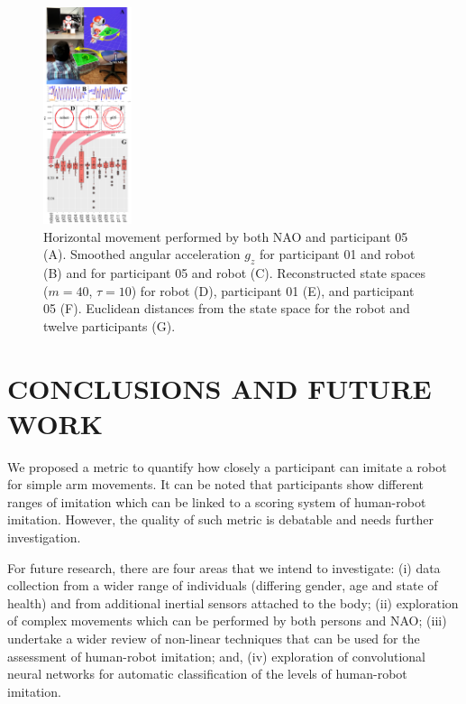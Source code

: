 \documentclass{sig-alternate-05-2015}
\begin{document}
\begin{figure}[ht]
\centering
\includegraphics[width=0.23\textwidth]{fig06}
\caption{
Horizontal movement performed by both NAO and participant 05 (A). 
Smoothed angular acceleration $g_z$ for participant 01  and robot (B)
and for participant 05 and robot (C).
Reconstructed state spaces  ($m=40$, $\tau=10$) for robot (D), participant 01 (E), and participant 05 (F).
Euclidean distances from the state space for the robot and twelve participants (G).
}
\label{fig:main}
\end{figure}



\section{CONCLUSIONS AND FUTURE WORK}
We proposed a metric to quantify how closely a participant can imitate a robot for simple arm
movements.
It can be noted
that participants show different ranges 
of imitation which can be linked to a scoring system of human-robot imitation.
However, the quality of such metric is debatable and needs further investigation.

For future research, there are four areas that we intend to investigate:
(i) data collection from a wider range of individuals (differing gender, age and state of health)
and from additional inertial sensors attached to the body;
(ii) exploration of complex movements which can be performed by both persons and NAO;
(iii) undertake a wider review of non-linear techniques that can be used for 
the assessment of human-robot imitation; and, 
(iv) exploration of convolutional neural networks for automatic 
classification of the levels of human-robot imitation.




 
\end{document}
